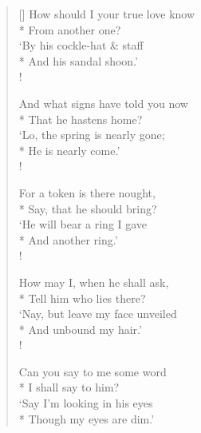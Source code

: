 \documentclass[MAIN]{subfiles}
\begin{document}
\settowidth{\versewidth}{How should I your true love know}
\begin{verse}[\versewidth]
How should I your true love know\\*
\vin From another one?\\
`By his cockle-hat \& staff\\*
\vin And his sandal shoon.'\\!

And what signs have told you now\\*
\vin That he hastens home?\\
`Lo, the spring is nearly gone;\\*
\vin He is nearly come.'\\!

For a token is there nought,\\*
\vin Say, that he should bring?\\
`He will bear a ring I gave\\*
\vin And another ring.'\\!

How may I, when he shall ask,\\*
\vin Tell him who lies there?\\
`Nay, but leave my face unveiled\\*
\vin And unbound my hair.'\\!

Can you say to me some word\\*
\vin I shall say to him?\\
`Say I'm looking in his eyes\\*
\vin Though my eyes are dim.'\\
\end{verse}
\end{document}
